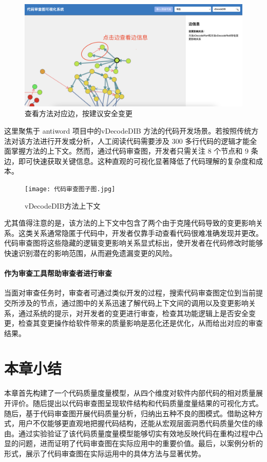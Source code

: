 \clearpage

\begin{figure}[h]
\centering
\includegraphics[width = 1.0\textwidth]{figures/开发3.jpg}
\caption{查看方法对应边，按建议安全变更}
\label{1_查看方法对应边，按建议安全变更}
\end{figure}

这里聚焦于 antiword 项目中的vDecodeDIB 方法的代码开发场景。若按照传统方法对该方法进行开发或分析，人工阅读代码需要涉及 300 多行代码的逻辑才能全面掌握方法的上下文。然而，通过代码审查图，开发者只需关注 8 个节点和 9 条边，即可快速获取关键信息。这种直观的可视化显著降低了代码理解的复杂度和成本。

\begin{figure}[h]
\centering
\texttt{[image: 代码审查图子图.jpg]}
\caption{vDecodeDIB方法上下文}
\end{figure}

尤其值得注意的是，该方法的上下文中包含了两个由于克隆代码导致的变更影响关系。这类关系通常隐匿于代码中，开发者仅靠手动查看代码很难准确发现并更改。代码审查图将这些隐藏的逻辑变更影响关系显式标出，使开发者在代码修改时能够快速识别潜在的影响范围，从而避免遗漏变更的风险。

\paragraph{作为审查工具帮助审查者进行审查} 当面对审查任务时，审查者可通过类似开发的过程，搜索代码审查图定位到当前提交所涉及的节点，通过图中的关系迅速了解代码上下文间的调用以及变更影响关系，通过系统的提示，对开发者的变更进行审查，检查其功能逻辑上是否安全变更，检查其变更操作给软件带来的质量影响是恶化还是优化，从而给出对应的审查结果。

\section{本章小结}

本章首先构建了一个代码质量度量模型，从四个维度对软件内部代码的相对质量展开评价。随后提出以代码审查图呈现软件结构和代码质量度量结果的可视化方式。随后，基于代码审查图开展代码质量分析，归纳出五种不良的图模式。借助这种方式，用户不仅能够更直观地把握代码结构，还能从宏观层面洞悉代码质量欠佳的缘由。通过实验验证了该代码质量度量模型能够切实有效地反映代码在重构过程中凸显的问题，进而证明了代码审查图在实际应用中的重要价值。最后，以案例分析的形式，展示了代码审查图在实际运用中的具体方法与显著优势。 

